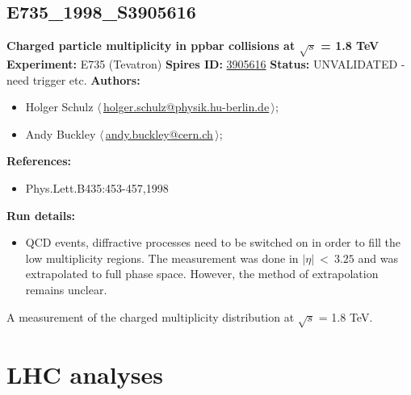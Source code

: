 \subsection[E735\_1998\_S3905616]{E735\_1998\_S3905616\,\cite{Alexopoulos:1998bi}}
\textbf{Charged particle multiplicity in ppbar collisions at \ensuremath{\sqrt{s}} = 1.8 TeV}\newline
\textbf{Experiment:} E735 (Tevatron) \newline
\textbf{Spires ID:} \href{http://www.slac.stanford.edu/spires/find/hep/www?rawcmd=key+3905616}{3905616}\newline
\textbf{Status:} UNVALIDATED - need trigger etc.\newline
\textbf{Authors:}
\begin{itemize}
  \item Holger Schulz $\langle\,$\href{mailto:holger.schulz@physik.hu-berlin.de}{holger.schulz@physik.hu-berlin.de}$\,\rangle$;
  \item Andy Buckley $\langle\,$\href{mailto:andy.buckley@cern.ch}{andy.buckley@cern.ch}$\,\rangle$;
\end{itemize}
\textbf{References:}
\begin{itemize}
  \item Phys.Lett.B435:453-457,1998
\end{itemize}
\textbf{Run details:}
\begin{itemize}

  \item QCD events, diffractive processes need to be switched on in order to fill the low multiplicity regions. The measurement was done in $\left|\eta\right| ~< ~3.25$ and was extrapolated to full phase space. However, the method of extrapolation remains unclear.\end{itemize}

\noindent A measurement of the charged multiplicity distribution at \ensuremath{\sqrt{s}} = 1.8 TeV.

\clearpage


\section{LHC analyses}
